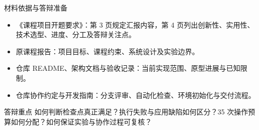 \begin{frame}{材料依据与答辩准备}
\begin{itemize}
\item 《课程项目开题要求》：第 3 页规定汇报内容，第 4 页列出创新性、实用性、技术选型、进度、分工及答辩关注点。
\item 原课程报告：项目目标、课程约束、系统设计及实验边界。
\item 仓库 README、架构文档与验收记录：当前实现范围、原型进展与已知限制。
\item 仓库协作约定与开发指南：分支评审、自动化检查、环境初始化与交付流程。
\end{itemize}
\begin{block}{答辩重点}
如何判断检查点真正满足？执行失败与应用缺陷如何区分？35 次操作预算如何分配？如何保证实验与协作过程可复核？
\end{block}
\end{frame}
